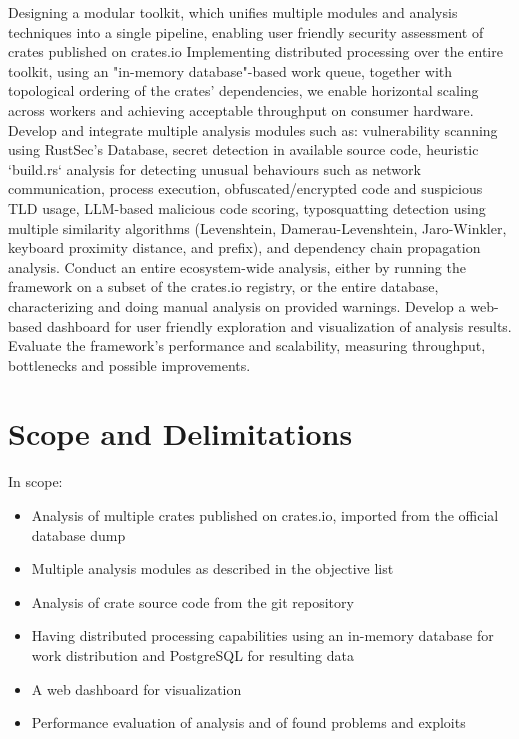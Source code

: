 Designing a modular toolkit, which unifies multiple modules and analysis techniques into a single pipeline, enabling user friendly security assessment of crates published on crates.io
Implementing distributed processing over the entire toolkit, using an "in-memory database"-based work queue, together with topological ordering of the crates' dependencies, we enable horizontal scaling across workers and achieving acceptable throughput on consumer hardware.
Develop and integrate multiple analysis modules such as: vulnerability scanning using RustSec's Database, secret detection in available source code, heuristic `build.rs` analysis for detecting unusual behaviours such as network communication, process execution, obfuscated/encrypted code and suspicious TLD usage, LLM-based malicious code scoring, typosquatting detection using multiple similarity algorithms (Levenshtein, Damerau-Levenshtein, Jaro-Winkler, keyboard proximity distance, and prefix), and dependency chain propagation analysis.
Conduct an entire ecosystem-wide analysis, either by running the framework on a subset of the crates.io registry, or the entire database, characterizing and doing manual analysis on provided warnings.
Develop a web-based dashboard for user friendly exploration and visualization of analysis results.
Evaluate the framework's performance and scalability, measuring throughput, bottlenecks and possible improvements.

\section{Scope and Delimitations}\label{sect:scope-delimitations}

In scope:
\begin{itemize}
	\item Analysis of multiple crates published on crates.io, imported from the official database dump
	\item Multiple analysis modules as described in the objective list
	\item Analysis of crate source code from the git repository
	\item Having distributed processing capabilities using an in-memory database for work distribution and PostgreSQL for resulting data
	\item A web dashboard for visualization
	\item Performance evaluation of analysis and of found problems and exploits
\end{itemize}


